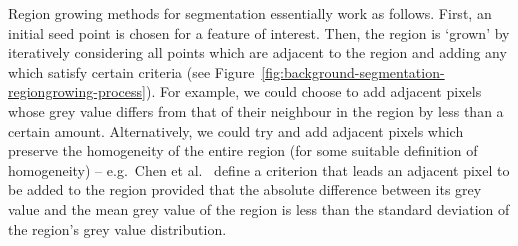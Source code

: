 Region growing methods for segmentation essentially work as follows. First, an initial seed point is chosen for a feature of interest. Then, the region is `grown' by iteratively considering all points which are adjacent to the region and adding any which satisfy certain criteria (see Figure~\ref{fig:background-segmentation-regiongrowing-process}). For example, we could choose to add adjacent pixels whose grey value differs from that of their neighbour in the region by less than a certain amount. Alternatively, we could try and add adjacent pixels which preserve the homogeneity of the entire region (for some suitable definition of homogeneity) -- e.g.~Chen et al.\ \cite{chen09} define a criterion that leads an adjacent pixel to be added to the region provided that the absolute difference between its grey value and the mean grey value of the region is less than the standard deviation of the region's grey value distribution.

